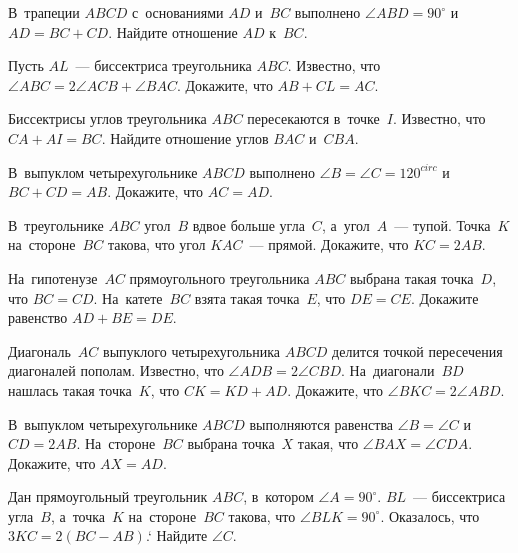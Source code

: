 


\begin{problems}

\item
В~трапеции $ABCD$ с~основаниями $AD$ и~$BC$ выполнено $\angle ABD = 90^{\circ}$
и~$AD = BC + CD$.
Найдите отношение $AD$ к~$BC$.

\item
Пусть $AL$~--- биссектриса треугольника $ABC$.
Известно, что $\angle ABC = 2 \angle ACB + \angle BAC$.
Докажите, что $AB + CL = AC$.

\item
Биссектрисы углов треугольника $ABC$ пересекаются в~точке~$I$.
Известно, что $CA + AI = BC$.
Найдите отношение углов $BAC$ и~$CBA$.

\item
В~выпуклом четырехугольнике $ABCD$ выполнено $\angle B = \angle C = 120^{circ}$
и~$BC + CD = AB$.
Докажите, что $AC = AD$.

\item
В~треугольнике $ABC$ угол~$B$ вдвое больше угла~$C$, а~угол~$A$~--- тупой.
Точка~$K$ на~стороне~$BC$ такова, что угол $KAC$~--- прямой.
Докажите, что $KC = 2AB$.

\item
На~гипотенузе~$AC$ прямоугольного треугольника $ABC$ выбрана такая точка~$D$,
что $BC = CD$.
На~катете~$BC$ взята такая точка~$E$, что $DE = CE$.
Докажите равенство $AD + BE = DE$.

\item
Диагональ~$AC$ выпуклого четырехугольника $ABCD$ делится точкой пересечения
диагоналей пополам.
Известно, что $\angle ADB = 2 \angle CBD$.
На~диагонали~$BD$ нашлась такая точка~$K$, что $CK = KD + AD$.
Докажите, что $\angle BKC = 2 \angle ABD$.

\item
В~выпуклом четырехугольнике $ABCD$ выполняются равенства $\angle B = \angle C$
и~$CD = 2 AB$.
На~стороне~$BC$ выбрана точка~$X$ такая, что $\angle BAX = \angle CDA$.
Докажите, что $AX = AD$.

\item
Дан прямоугольный треугольник $ABC$, в~котором $\angle A = 90^\circ$.
$BL$~--- биссектриса угла~$B$, а~точка~$K$ на~стороне~$BC$ такова, что
$\angle BLK = 90^\circ$.
Оказалось, что $3 KC = 2 (BC - AB)$.`
Найдите $\angle C$.

\end{problems}


